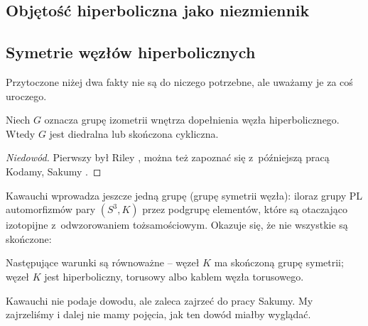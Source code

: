\subsection{Objętość hiperboliczna jako niezmiennik}



\subsection{Symetrie węzłów hiperbolicznych}
Przytoczone niżej dwa fakty nie są do niczego potrzebne, ale uważamy je za coś uroczego.

\begin{proposition}
    Niech $G$ oznacza grupę izometrii wnętrza dopełnienia węzła hiperbolicznego.
    Wtedy $G$ jest diedralna lub skończona cykliczna.
\end{proposition}

\begin{proof}[Niedowód]
%
%
%
    Pierwszy był Riley \cite[s. 124]{riley1979}, można też zapoznać się z~późniejszą pracą Kodamy, Sakumy \cite{kodama1992}.
\end{proof}

Kawauchi \cite[s. 131]{kawauchi1996} wprowadza jeszcze jedną grupę (grupę symetrii węzła): iloraz grupy PL automorfizmów pary $(S^3, K)$ przez podgrupę elementów, które są otaczająco izotopijne z~odwzorowaniem tożsamościowym.
Okazuje się, że nie wszystkie są skończone:

\begin{proposition}
    Następujące warunki są równoważne -- węzeł $K$ ma skończoną grupę symetrii; węzeł $K$ jest hiperboliczny, torusowy albo kablem węzła torusowego.
\end{proposition}

Kawauchi nie podaje dowodu, ale zaleca zajrzeć do pracy Sakumy.
My zajrzeliśmy i dalej nie mamy pojęcia, jak ten dowód miałby wyglądać.



